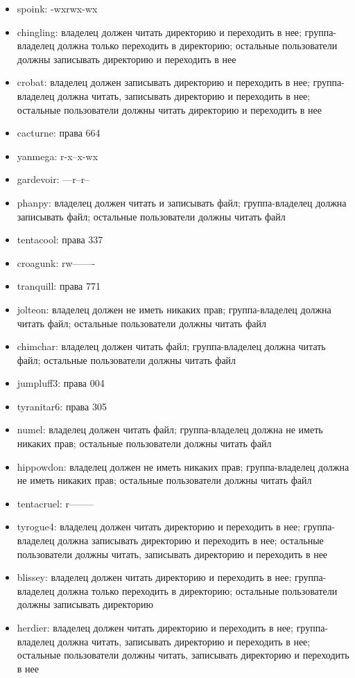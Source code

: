 \documentclass{article}
\begin{document}
\begin{itemize}
  \item spoink: -wxrwx-wx
  \item chingling: владелец должен читать директорию и переходить в нее; группа-владелец должна только переходить в директорию; остальные пользователи должны записывать директорию и переходить в нее
  \item crobat: владелец должен записывать директорию и переходить в нее; группа-владелец должна читать, записывать директорию и переходить в нее; остальные пользователи должны читать директорию и переходить в нее
  \item cacturne: права 664
  \item yanmega: r-x--x-wx
  \item gardevoir: ---r--r--
  \item phanpy: владелец должен читать и записывать файл; группа-владелец должна записывать файл; остальные пользователи должны читать файл
  \item tentacool: права 337
  \item croagunk: rw-------
  \item tranquill: права 771
  \item jolteon: владелец должен не иметь никаких прав; группа-владелец должна читать файл; остальные пользователи должны читать файл
  \item chimchar: владелец должен читать файл; группа-владелец должна читать файл; остальные пользователи должны читать файл
  \item jumpluff3: права 004
  \item tyranitar6: права 305
  \item numel: владелец должен читать файл; группа-владелец должна не иметь никаких прав; остальные пользователи должны читать файл
  \item hippowdon: владелец должен не иметь никаких прав; группа-владелец должна не иметь никаких прав; остальные пользователи должны читать файл
  \item tentacruel: r--------
  \item tyrogue4: владелец должен читать директорию и переходить в нее; группа-владелец должна записывать директорию и переходить в нее; остальные пользователи должны читать, записывать директорию и переходить в нее
  \item blissey: владелец должен читать директорию и переходить в нее; группа-владелец должна только переходить в директорию; остальные пользователи должны записывать директорию
  \item herdier: владелец должен читать директорию и переходить в нее; группа-владелец должна читать, записывать директорию и переходить в нее; остальные пользователи должны читать, записывать директорию и переходить в нее

\end{itemize}
\end{document}
